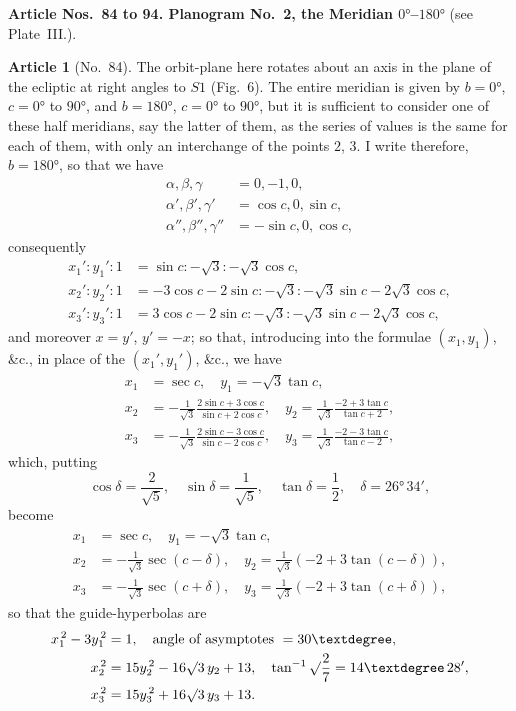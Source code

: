\documentclass[11pt,a4paper]{article}
\theoremstyle{definition}
\newtheorem{art}{Article}
\begin{document}
\newpage
\noindent\textbf{Article Nos.~84 to 94. Planogram No.~2, the Meridian $0°$--$180°$} (see Plate~III.).

\begin{art}[No.~84]
The orbit-plane here rotates about an axis in the plane of the ecliptic at right angles to $S1$ (Fig.~6). The entire meridian is given by $b = 0°$, $c = 0°$ to $90°$, and $b = 180°$, $c = 0°$ to $90°$, but it is sufficient to consider one of these half meridians, say the latter of them, as the series of values is the same for each of them, with only an interchange of the points $2$, $3$. I write therefore, $b = 180°$, so that we have
\begin{align*}
\alpha, \beta, \gamma &= 0, -1, 0,\\
\alpha', \beta', \gamma' &= \cos c, 0, \sin c,\\
\alpha'', \beta'', \gamma'' &= -\sin c, 0, \cos c,
\end{align*}
consequently
\begin{align*}
x_1' : y_1' : 1 &= \sin c : -\surd 3 : -\surd 3 \cos c,\\
x_2' : y_2' : 1 &= -3\cos c - 2\sin c : -\surd 3 : -\surd 3 \sin c - 2\surd 3 \cos c,\\
x_3' : y_3' : 1 &= 3\cos c - 2\sin c : -\surd 3 : -\surd 3 \sin c - 2\surd 3 \cos c,
\end{align*}
and moreover $x = y'$, $y' = -x$; so that, introducing into the formulae $(x_1, y_1)$, \&c., in place of the $(x_1', y_1')$, \&c., we have
\begin{align*}
x_1 &= \sec c, \quad y_1 = -\surd 3 \tan c,\\
x_2 &= -\frac{1}{\surd 3} \frac{2\sin c + 3\cos c}{\sin c + 2\cos c}, \quad y_2 = \frac{1}{\surd 3} \frac{-2 + 3\tan c}{\tan c + 2},\\
x_3 &= -\frac{1}{\surd 3} \frac{2\sin c - 3\cos c}{\sin c - 2\cos c}, \quad y_3 = \frac{1}{\surd 3} \frac{-2 - 3\tan c}{\tan c - 2},
\end{align*}
which, putting
\[
\cos\delta = \frac{2}{\surd 5}, \quad \sin\delta = \frac{1}{\surd 5}, \quad \tan\delta = \frac{1}{2}, \quad \delta = 26°\, 34',
\]
become
\begin{align*}
x_1 &= \sec c, \quad y_1 = -\surd 3 \tan c,\\
x_2 &= -\frac{1}{\surd 3} \sec(c - \delta), \quad y_2 = \frac{1}{\surd 3}(-2 + 3\tan(c - \delta)),\\
x_3 &= -\frac{1}{\surd 3} \sec(c + \delta), \quad y_3 = \frac{1}{\surd 3}(-2 + 3\tan(c + \delta)),
\end{align*}
so that the guide-hyperbolas are
\begin{align*}
x_1^{\,2} - 3y_1^{\,2} &= 1, \quad \text{angle of asymptotes } = 30°,\\
x_2^{\,2} &= 15y_2^{\,2} - 16\surd 3\, y_2 + 13, \quad \tan^{-1} \surd\frac{2}{7} = 14°\, 28',\\
x_3^{\,2} &= 15y_3^{\,2} + 16\surd 3\, y_3 + 13.
\end{align*}
\end{art}
\end{document}
